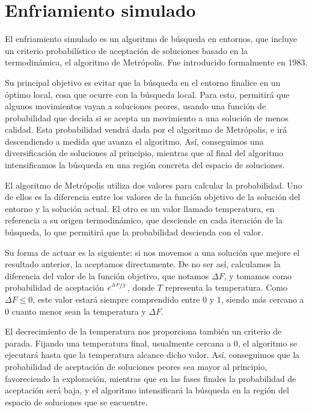 \section{Enfriamiento simulado}

El enfriamiento simulado es un algoritmo de búsqueda en entornos, que incluye un
criterio probabilístico de aceptación de soluciones basado en la termodinámica,
el algoritmo de Metrópolis. Fue introducido formalmente en 1983.

Su principal objetivo es evitar que la búsqueda en el entorno finalice en un óptimo
local, cosa que ocurre con la búsqueda local. Para esto, permitirá que algunos
movimientos vayan a soluciones peores, usando una función de probabilidad que decida
si se acepta un movimiento a una solución de menos calidad. Esta probabilidad vendrá
dada por el algoritmo de Metrópolis, e irá descendiendo a medida que avanza el algoritmo.
Así, conseguimos una diversificación de soluciones al principio, mientras que al final
del algoritmo intensificamos la búsqueda en una región concreta del espacio de soluciones.

El algoritmo de Metrópolis utiliza dos valores para calcular la probabilidad. Uno de ellos
es la diferencia entre los valores de la función objetivo de la solución del entorno y
la solución actual. El otro es un valor llamado temperatura, en referencia a su origen
termodinámico, que desciende en cada iteración de la búsqueda, lo que permitirá que
la probabilidad descienda con el valor.

Su forma de actuar es la siguiente: si nos movemos a una solución que mejore el resultado
anterior, la aceptamos directamente. De no ser así, calculamos la diferencia del valor de
la función objetivo, que notamos $\Delta F$, y tomamos como probabilidad de aceptación
$e^{\nicefrac{\Delta F}{T}}$, donde $T$ representa la temperatura. Como $\Delta F \leq 0$,
este valor estará siempre comprendido entre $0$ y $1$, siendo más cercano a $0$ cuanto
menor sean la temperatura y $\Delta F$.

El decrecimiento de la temperatura nos proporciona también un criterio de parada. Fijando
una temperatura final, usualmente cercana a $0$, el algoritmo se ejecutará hasta que la
temperatura alcance dicho valor. Así, conseguimos que la probabilidad de aceptación de
soluciones peores sea mayor al principio, favoreciendo la exploración, mientras que en
las fases finales la probabilidad de aceptación será baja, y el algoritmo intensificará
la búsqueda en la región del espacio de soluciones que se encuentre.

